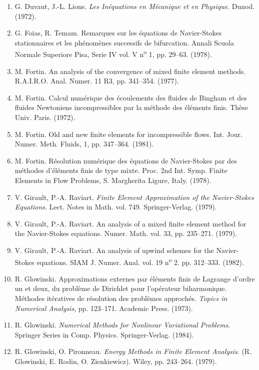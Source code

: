 \begin{enumerate}
\item G. Duvaut, J.-L. Lions. \textit{Les Inéquations en Mécanique et en Physique}. Dunod. (1972).
\item G. Foias, R. Temam. Remarques sur les équations de Navier-Stokes stationnaires et les phénomènes successifs de bifurcation. Annali Scuola Normale Superiore Pisa, Serie IV vol. V n\textsuperscript{o} 1, pp. 29--63. (1978).
\item M. Fortin. An analysis of the convergence of mixed finite element methods. R.A.I.R.O. Anal. Numer. 11 R3, pp. 341--354. (1977).
\item M. Fortin. Calcul numérique des écoulements des fluides de Bingham et des fluides Newtoniens incompressibles par la méthode des éléments finis. Thèse Univ. Paris. (1972).
\item M. Fortin. Old and new finite elements for incompressible flows. Int. Jour. Numer. Meth. Fluids, 1, pp. 347--364. (1981).
\item {}M. Fortin. Résolution numérique des équations de Navier-Stokes par des méthodes d'éléments finis de type mixte. Proc. 2nd Int. Symp. Finite Elements in Flow Problems, S. Margherita Ligure, Italy. (1978).
\item V. Girault, P.-A. Raviart. \textit{Finite Element Approximation of the Navier-Stokes Equations}. Lect. Notes in Math. vol. 749. Springer-Verlag. (1979).
\item V. Girault, P.-A. Raviart. An analysis of a mixed finite element method for the Navier-Stokes equations. Numer. Math. vol. 33, pp. 235--271. (1979).
\item {}V. Girault, P.-A. Raviart. An analysis of upwind schemes for the Navier-Stokes equations. SIAM J. Numer. Anal. vol. 19 n\textsuperscript{o} 2. pp. 312--333. (1982).
\item R. Glowinski. Approximations externes par éléments finis de Lagrange d'ordre un et deux, du problème de Dirichlet pour l'opérateur biharmonique. Méthodes itératives de résolution des problèmes approchés. \textit{Topics in Numerical Analysis}, pp. 123--171. Academic Press. (1973).
\item {}R. Glowinski. \textit{Numerical Methods for Nonlinear Variational Problems}. Springer Series in Comp. Physics. Springer-Verlag. (1984).
\item R. Glowinski, O. Pironneau. \textit{Energy Methods in Finite Element Analysis}. (R. Glowinski, E. Rodin, O. Zienkiewicz). Wiley, pp. 243--264. (1979).

\end{enumerate}
